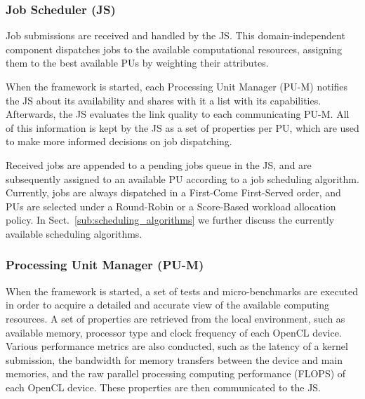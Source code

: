 \documentclass[runningheads,a4paper]{llncs}
\begin{document}
\subsubsection{Job Scheduler (JS)}
\label{subsub:job_scheduler}

Job submissions are received and handled by the JS\@.
This domain-independent component dispatches jobs to the available computational resources, assigning them to the best available PUs by weighting their attributes.

When the framework is started, each Processing Unit Manager (PU-M) notifies the JS about its availability and shares with it a list with its capabilities. Afterwards, the JS evaluates the link quality to each communicating PU-M\@. All of this information is kept by the JS as a set of properties per PU, which are used to make more informed decisions on job dispatching.

Received jobs are appended to a pending jobs queue in the JS\@, and are subsequently assigned to an available PU according to a job scheduling algorithm. Currently, jobs are always dispatched in a First-Come First-Served order, and PUs are selected under a Round-Robin or a Score-Based workload allocation policy. 
In Sect.~\ref{sub:scheduling_algorithms} we further discuss the currently available scheduling algorithms.


\subsubsection{Processing Unit Manager (PU-M)}
\label{subsub:PUM}

When the framework is started, a set of tests and micro-benchmarks are executed in order to acquire a detailed and accurate view of the available computing resources. A set of properties are retrieved from the local environment, such as available memory, processor type and clock frequency of each OpenCL device. Various performance metrics are also conducted, such as the latency of a kernel submission, the bandwidth for memory transfers between the device and main memories, and the raw parallel processing computing performance (FLOPS) of each OpenCL device. These properties are then communicated to the JS.
\end{document}
